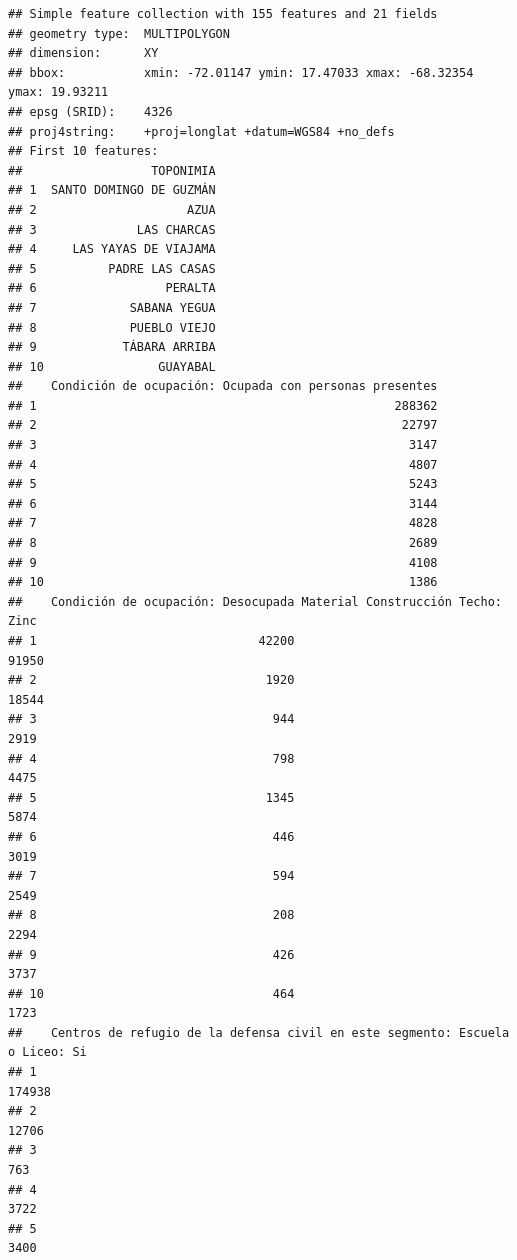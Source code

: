 \documentclass[11pt,]{article}
\begin{document}
\begin{verbatim}
## Simple feature collection with 155 features and 21 fields
## geometry type:  MULTIPOLYGON
## dimension:      XY
## bbox:           xmin: -72.01147 ymin: 17.47033 xmax: -68.32354 ymax: 19.93211
## epsg (SRID):    4326
## proj4string:    +proj=longlat +datum=WGS84 +no_defs
## First 10 features:
##                  TOPONIMIA
## 1  SANTO DOMINGO DE GUZMÁN
## 2                     AZUA
## 3              LAS CHARCAS
## 4     LAS YAYAS DE VIAJAMA
## 5          PADRE LAS CASAS
## 6                  PERALTA
## 7             SABANA YEGUA
## 8             PUEBLO VIEJO
## 9            TÁBARA ARRIBA
## 10                GUAYABAL
##    Condición de ocupación: Ocupada con personas presentes
## 1                                                  288362
## 2                                                   22797
## 3                                                    3147
## 4                                                    4807
## 5                                                    5243
## 6                                                    3144
## 7                                                    4828
## 8                                                    2689
## 9                                                    4108
## 10                                                   1386
##    Condición de ocupación: Desocupada Material Construcción Techo: Zinc
## 1                               42200                             91950
## 2                                1920                             18544
## 3                                 944                              2919
## 4                                 798                              4475
## 5                                1345                              5874
## 6                                 446                              3019
## 7                                 594                              2549
## 8                                 208                              2294
## 9                                 426                              3737
## 10                                464                              1723
##    Centros de refugio de la defensa civil en este segmento: Escuela o Liceo: Si
## 1                                                                        174938
## 2                                                                         12706
## 3                                                                           763
## 4                                                                          3722
## 5                                                                          3400

\end{verbatim}
\end{document}
